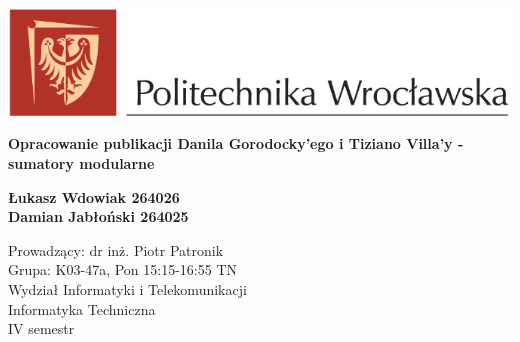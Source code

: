 \begin{titlepage}
    \begin{center}


        \vspace*{-3cm}

        \includegraphics[width=14cm]{images/image.png}

        \vspace*{2cm}
        \huge
        \textbf{Opracowanie publikacji Danila Gorodocky’ego i Tiziano Villa’y - sumatory modularne}

        \vspace{0.5cm}


        \vspace{1.5cm}

        \textbf{Łukasz Wdowiak 264026} \\
        \textbf{Damian Jabłoński 264025}
        \vspace{2cm}

        \vfill
        Prowadzący: dr inż. Piotr Patronik \\
        Grupa: K03-47a, Pon 15:15-16:55 TN \\
        \vspace{2cm}
        Wydział Informatyki i Telekomunikacji \\
        Informatyka Techniczna \\
        IV semestr\\




    \end{center}
\end{titlepage}